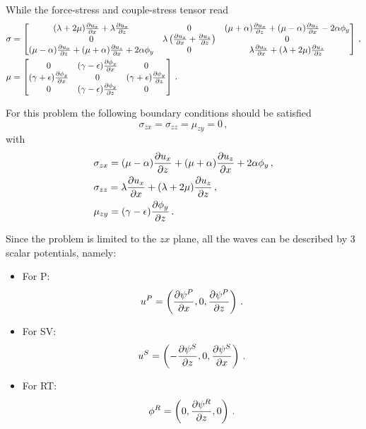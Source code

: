 \documentclass[12pt]{article}
\begin{document}
While the force-stress and  couple-stress tensor read
\begin{align*}
&\sigma = \begin{bmatrix}
  (\lambda + 2\mu)\pdv{u_x}{x} + \lambda \pdv{u_x}{z} &0 &(\mu + \alpha)\pdv{u_x}{z} + (\mu - \alpha)\pdv{u_z}{x} - 2\alpha \phi_y\\
  0 &\lambda\left(\pdv{u_x}{x} + \pdv{u_z}{z}\right) & 0\\
  (\mu - \alpha)\pdv{u_x}{z} + (\mu + \alpha)\pdv{u_z}{x} + 2\alpha \phi_y &0 &\lambda\pdv{u_x}{x} + (\lambda + 2\mu)\pdv{u_z}{z}
\end{bmatrix}\, ,\\
&\mu = \begin{bmatrix}
  0 &(\gamma - \epsilon)\pdv{\phi_y}{x} &0\\
  (\gamma + \epsilon)\pdv{\phi_y}{x} &0 &(\gamma + \epsilon)\pdv{\phi_y}{z}\\
  0 &(\gamma - \epsilon)\pdv{\phi_y}{z} &0
\end{bmatrix}\, .
\end{align*}

For this problem the following boundary conditions should be satisfied
\[\sigma_{zx} = \sigma_{zz} = \mu_{zy} = 0\, ,\]
with
\begin{align*}
&\sigma_{zx} = (\mu - \alpha)\pdv{u_x}{z} + (\mu + \alpha)\pdv{u_z}{x} + 2\alpha \phi_y\, ,\\
&\sigma_{zz} = \lambda\pdv{u_x}{x} + (\lambda + 2\mu)\pdv{u_z}{z}\, ,\\
&\mu_{zy} = (\gamma - \epsilon)\pdv{\phi_y}{z}\, .
\end{align*}

Since the problem is limited to the \(zx\) plane, all the waves can be described by 3 scalar potentials, namely:
\begin{itemize}

\item For P:
\begin{displaymath}
  u^P = \left(\pdv{\psi^P}{x}, 0, \pdv{\psi^P}{z}\right)\, .
\end{displaymath}

\item For SV:
\begin{displaymath}
  u^S = \left(-\pdv{\psi^S}{z}, 0, \pdv{\psi^S}{x}\right)\, .
\end{displaymath}

\item For RT:
\begin{displaymath}
  \phi^{R} = \left(0, \pdv{\psi^{R}}{z}, 0\right)\, .
\end{displaymath}
\end{itemize}
\end{document}
